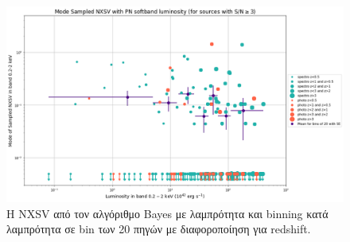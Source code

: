 \begin{figure} \includegraphics[width=1.12\linewidth]{Figures/Mode Sampled NXSV vs Lumi w BINS B.png} \caption{ Η \textlatin{NXSV} από τον αλγόριθμο \textlatin{Bayes} με λαμπρότητα και \textlatin{binning} κατά λαμπρότητα σε \textlatin{bin} των 20 πηγών με διαφοροποίηση για \textlatin{redshift.}} \label{fig:SampledResultB}  \end{figure}
 
